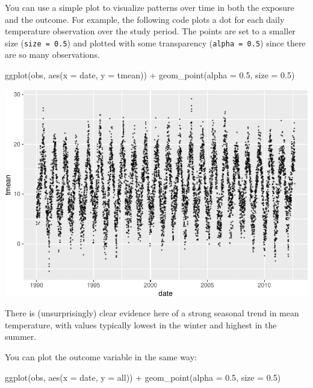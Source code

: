 \documentclass[
]{book}
\newenvironment{Shaded}{\begin{snugshade}}{\end{snugshade}}
\newcommand{\AttributeTok}[1]{\textcolor[rgb]{0.77,0.63,0.00}{#1}}
\newcommand{\FloatTok}[1]{\textcolor[rgb]{0.00,0.00,0.81}{#1}}
\newcommand{\FunctionTok}[1]{\textcolor[rgb]{0.00,0.00,0.00}{#1}}
\newcommand{\NormalTok}[1]{#1}
\newcommand{\SpecialCharTok}[1]{\textcolor[rgb]{0.00,0.00,0.00}{#1}}
\begin{document}
You can use a simple plot to visualize patterns over time in both the exposure
and the outcome. For example, the following code plots a dot for each daily
temperature observation over the study period. The points are set to a smaller
size (\texttt{size\ =\ 0.5}) and plotted with some transparency (\texttt{alpha\ =\ 0.5}) since
there are so many observations.

\begin{Shaded}
\begin{Highlighting}[]
\FunctionTok{ggplot}\NormalTok{(obs, }\FunctionTok{aes}\NormalTok{(}\AttributeTok{x =}\NormalTok{ date, }\AttributeTok{y =}\NormalTok{ tmean)) }\SpecialCharTok{+} 
  \FunctionTok{geom\_point}\NormalTok{(}\AttributeTok{alpha =} \FloatTok{0.5}\NormalTok{, }\AttributeTok{size =} \FloatTok{0.5}\NormalTok{)}
\end{Highlighting}
\end{Shaded}

\includegraphics{adv_epi_analysis_files/figure-latex/unnamed-chunk-9-1.pdf}

There is (unsurprisingly) clear evidence here of a strong seasonal trend in mean temperature,
with values typically lowest in the winter and highest in the summer.

You can plot the outcome variable in the same way:

\begin{Shaded}
\begin{Highlighting}[]
\FunctionTok{ggplot}\NormalTok{(obs, }\FunctionTok{aes}\NormalTok{(}\AttributeTok{x =}\NormalTok{ date, }\AttributeTok{y =}\NormalTok{ all)) }\SpecialCharTok{+} 
  \FunctionTok{geom\_point}\NormalTok{(}\AttributeTok{alpha =} \FloatTok{0.5}\NormalTok{, }\AttributeTok{size =} \FloatTok{0.5}\NormalTok{)}
\end{Highlighting}
\end{Shaded}
\end{document}
